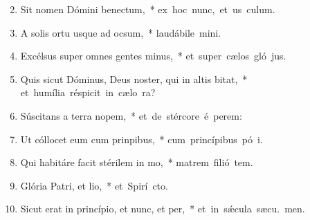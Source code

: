 \begin{flushleft}
\begin{enumerate}[leftmargin=*]
\setcounter{enumi}{1}

\item Sit nomen Dómini benectum,~* \mbox{ex hoc nunc, et us  culum.}

\item A solis ortu usque ad ocsum,~* \mbox{laudábile  mini.}

\item Excélsus super omnes gentes minus,~* \mbox{et super cælos gló jus.}

\item Quis sicut Dóminus, Deus noster, qui in altis bitat,~* \mbox{et humília réspicit in cælo   ra?}

\item Súscitans a terra nopem,~* \mbox{et de stércore é perem:}

\item Ut cóllocet eum cum prinpibus,~* \mbox{cum princípibus pó i.}

\item Qui habitáre facit stérilem in mo,~* \mbox{matrem filió tem.}

\item Glória Patri, et lio,~* \mbox{et Spirí cto.}

\item Sicut erat in princípio, et nunc, et per,~* \mbox{et in s\'{\ae}cula sæcu. men.}



\end{enumerate}
\end{flushleft}

